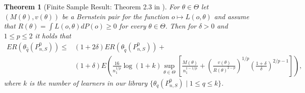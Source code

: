 \documentclass[11pt, a4paper]{article}
\newtheorem{theorem}{Theorem}
\theoremstyle{definition}
\theoremstyle{remark}
\newcommand{\cl}{q}
\begin{document}
\begin{theorem}[Finite Sample Result: Theorem 2.3 in \cite{vaart06}] \label{finitesample}
   For $ \theta \in \Theta $ let $ (M(\theta) , v(\theta)) $ be a Bernstein pair for the function $ o \mapsto L(o, \theta) $ and assume that $ R(\theta) = \int L(o, \theta) d P(o) \geq 0 $ for every $ \theta \in \Theta $. Then for $ \delta > 0 $ and $ 1 \leq p \leq 2 $ it holds that 
   \begin{align*}
       ER(\theta_{\hat{\cl}}(P_{n, S}^{0})) \leq&(1 + 2 \delta) ER(\theta_{ \tilde{\cl}}(P_{n,S}^{0})) +\\
                                              &(1 + \delta) E \left(  \frac{16}{n_1^{1/p}} \log (1 +k) \sup_{\theta \in \Theta} \left[ \frac{M(\theta)}{n_1^{1-1/p}} +  \left( \frac{v(\theta)}{R(\theta)^{2-p}} \right)^{1/p} \left( \frac{1 + \delta}{\delta} \right)^{2/p-1} \right]\right),
   \end{align*}
   where $ k $ is the number of learners in our library $ \{\theta_{\cl}(P_{n, S}^{0}) \mid 1 \leq \cl \leq k\} $. 
\end{theorem}
\end{document}
